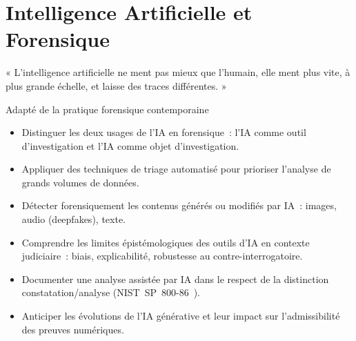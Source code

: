 
\chapter{Intelligence Artificielle et Forensique}
\label{chap:ia-for}

\epigraph{%
    « L'intelligence artificielle ne ment pas mieux que l'humain,
    elle ment plus vite, à plus grande échelle, et laisse des traces
    différentes. »%
}{Adapté de la pratique forensique contemporaine}


\begin{boxobjectifs}
\begin{itemize}
    \item Distinguer les deux usages de l'IA en forensique~: l'IA
          comme outil d'investigation et l'IA comme objet d'investigation.
    \item Appliquer des techniques de triage automatisé pour
          prioriser l'analyse de grands volumes de données.
    \item Détecter forensiquement les contenus générés ou modifiés
          par IA~: images, audio (deepfakes), texte.
    \item Comprendre les limites épistémologiques des outils d'IA
          en contexte judiciaire~: biais, explicabilité, robustesse
          au contre-interrogatoire.
    \item Documenter une analyse assistée par IA dans le respect
          de la distinction constatation/analyse (NIST~SP~800-86~\cite{nist80086}).
    \item Anticiper les évolutions de l'IA générative et leur
          impact sur l'admissibilité des preuves numériques.
\end{itemize}
\end{boxobjectifs}

\bigskip

